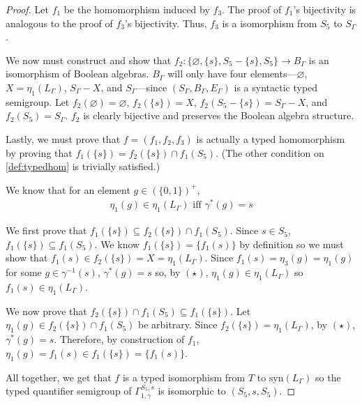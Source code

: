 \documentclass[a4paper,UKenglish,cleveref, autoref, thm-restate, anonymous]{lipics-v2021}
\begin{document}
\begin{proof}
    Let $f_1$ be the homomorphism induced by $f_3$. The proof of $f_1$'s bijectivity is analogous to the proof of $f_3$'s bijectivity. Thus, $f_3$ is a isomorphism from $S_5$ to $S_\Gamma$.

    We now must construct and show that $f_2 : \{\varnothing, \{s\}, S_5 - \{s\}, S_5\} \rightarrow B_\Gamma$ is an isomorphism of Boolean algebras. $B_\Gamma$ will only have four elements---$\varnothing$, $X = \eta_1(L_\Gamma)$, $S_\Gamma -X$, and $S_\Gamma$---since $(S_\Gamma, B_\Gamma, E_\Gamma)$ is a syntactic typed semigroup. Let $f_2(\varnothing) = \varnothing$, $f_2(\{s\}) = X$, $f_2(S_5 - \{s\}) = S_\Gamma - X$, and $f_2(S_5) = S_\Gamma$. $f_2$ is clearly bijective and preserves the Boolean algebra structure.

    Lastly, we must prove that $f = (f_1, f_2, f_3)$ is actually a typed homomorphism by proving that $f_1(\{s\}) = f_2(\{s\}) \cap f_1(S_5)$. (The other condition on \autoref{def:typedhom} is trivially satisfied.)

    We know that for an element $g \in (\{0,1\})^+$,
    \begin{align*}
        \eta_1(g) \in \eta_1(L_\Gamma) \text{ iff }\gamma^*(g) = s\tag{$\star$}
    \end{align*}
    
    We first prove that $f_1(\{s\}) \subseteq f_2(\{s\}) \cap f_1(S_5)$. Since $s \in S_5$, $f_1(\{s\}) \subseteq f_1(S_5)$. We know $f_1(\{s\}) = \{f_1(s)\}$ by definition so we must show that $f_1(s) \in f_2(\{s\}) = X = \eta_1(L_\Gamma)$. Since $f_1(s) = \eta_3(g) = \eta_1(g)$ for some $g \in \gamma^{-1}(s)$, $\gamma^*(g) = s$ so, by $(\star)$, $\eta_1(g) \in \eta_1(L_\Gamma)$ so $f_1(s) \in \eta_1(L_\Gamma)$.

    We now prove that $f_2(\{s\}) \cap f_1(S_5) \subseteq f_1(\{s\})$. Let $\eta_1(g) \in f_2(\{s\}) \cap f_1(S_5)$ be arbitrary. Since $f_2(\{s\}) = \eta_1(L_\Gamma)$, by $(\star)$, $\gamma^*(g) = s$. Therefore, by construction of $f_1$, $\eta_1(g) = f_1(s) \in f_1(\{s\}) = \{f_1(s)\}$.

    All together, we get that $f$ is a typed isomorphism from $T$ to $\text{syn}(L_\Gamma)$ so the typed quantifier semigroup of $\Gamma^{S_5,s}_{1,\gamma}$ is isomorphic to $(S_5, s, S_5)$.
\end{proof}
\end{document}
